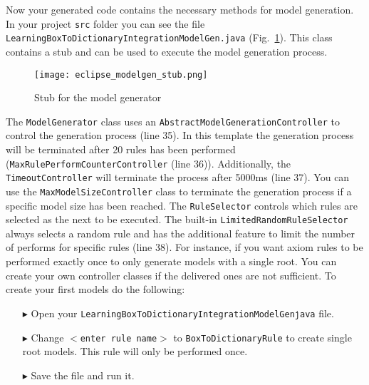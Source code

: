  

  
  
Now your generated code contains the necessary methods for model generation.
In your project \texttt{src} folder you can see the file
\texttt{Learning\-Box\-To\-Dictionary\-Integration\-Model\-Gen.java}
(Fig.~\ref{eclipse:modelgen}).
This class contains a stub and can be used to execute the model generation process.
 

 
\begin{figure}[htbp]
\renewcommand\figurename{Figure}
\begin{center}
\texttt{[image: eclipse\_modelgen\_stub.png]}
\caption{Stub for the model generator}
\label{eclipse:modelgen}
\end{center}
\end{figure}

The \texttt{ModelGenerator} class uses an
\texttt{AbstractModelGenerationController} to control the generation process (line 35). In
this template the generation process will be terminated after 20 rules has been
performed (\texttt{Max\-Rule\-Perform\-Counter\-Controller} (line 36)). 
Additionally, the \texttt{Time\-out\-Con\-trol\-ler} will terminate the process after 5000ms (line 37). You can use the \texttt{Max\-Model\-Size\-Controller} class to terminate the generation process if
a specific model size has been reached. 
The \texttt{RuleSelector} controls which rules are selected as the next to be executed. 
The built-in \texttt{LimitedRandomRuleSelector} always selects a random rule and has the additional feature to limit the number of performs for specific rules (line 38).
For instance, if you want axiom rules to be performed exactly once to only generate models with a single root. 
You can create your own controller classes if the delivered ones are not sufficient. 
To create your first models do the following:


\begin{itemize}

\item[$\blacktriangleright$] Open your
\texttt{Learning\-Box\-To\-Dictionary\-Integration\-Model\-Gen\.java} file.

\item[$\blacktriangleright$] Change \texttt{$<$enter rule name$>$} to \texttt{BoxToDictionaryRule} to
create single root models. This rule will only be performed once.

\item[$\blacktriangleright$] Save the file and run it.

\end{itemize}

